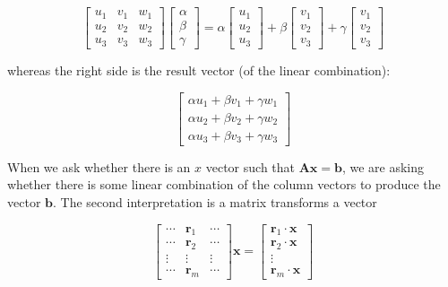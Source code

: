 \documentclass[main.tex]{subfiles}
\begin{document}
    $$\left[\begin{array}{lll}u_{1} & v_{1} & w_{1} \\ u_{2} & v_{2} & w_{2} \\ u_{3} & v_{3} & w_{3}\end{array}\right]\left[\begin{array}{l}\alpha \\ \beta \\ \gamma\end{array}\right]=\alpha\left[\begin{array}{l}u_{1} \\ u_{2} \\ u_{3}\end{array}\right]+\beta\left[\begin{array}{l}v_{1} \\ v_{2} \\ v_{3}\end{array}\right]+\gamma\left[\begin{array}{l}v_{1} \\ v_{2} \\ v_{3}\end{array}\right]$$
    
    whereas the right side is the result vector (of the linear combination):
    
    $$\left[\begin{array}{l}\alpha u_{1}+\beta v_{1}+\gamma w_{1} \\ \alpha u_{2}+\beta v_{2}+\gamma w_{2} \\ \alpha u_{3}+\beta v_{3}+\gamma w_{3}\end{array}\right]$$
    
    When we ask whether there is an $x$ vector such that $\mathbf{A x}=\mathbf{b}$, we are asking whether there is some linear combination of the column vectors to produce the vector $\mathbf{b}$. The second interpretation is a matrix transforms a vector
    
    $$\left[\begin{array}{ccc}\cdots & \mathbf{r}_{1} & \cdots \\ \cdots & \mathbf{r}_{2} & \cdots \\ \vdots & \vdots & \vdots \\ \cdots & \mathbf{r}_{m} & \cdots\end{array}\right] \mathbf{x}=\left[\begin{array}{c}\mathbf{r}_{1} \cdot \mathbf{x} \\ \mathbf{r}_{2} \cdot \mathbf{x} \\ \vdots \\ \mathbf{r}_{m} \cdot \mathbf{x}\end{array}\right]$$
    
\end{document}
